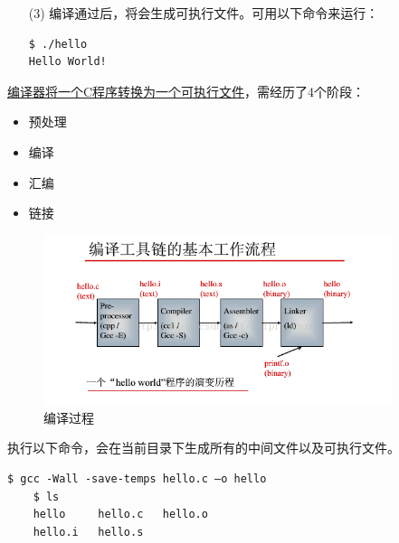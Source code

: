 \begin{frame}[fragile]\ft{\secname}
  \begin{itemize}
  \item[(3)] 编译通过后，将会生成可执行文件。可用以下命令来运行：
    \begin{lstlisting}[backgroundcolor=\color{red!10}]
$ ./hello
Hello World!
    \end{lstlisting}
  \end{itemize}
\end{frame}



\begin{frame}[fragile]\ft{\secname}
  \href{https://blog.csdn.net/elfprincexu/article/details/45043971}{编译器将一个C程序转换为一个可执行文件}，需经历了4个阶段：
  \begin{itemize}
  \item 预处理
  \item 编译
  \item 汇编
  \item 链接
  \end{itemize}

  \begin{figure}
    \centering
    \includegraphics[width=4in]{slide01/images/compile.png}
    \caption{编译过程}
    \label{fig:1}
  \end{figure}
  
\end{frame}


\begin{frame}[fragile]\ft{\secname}
  执行以下命令，会在当前目录下生成所有的中间文件以及可执行文件。
  \begin{lstlisting}[backgroundcolor=\color{red!10}]
    $ gcc -Wall -save-temps hello.c –o hello 
    $ ls 
    hello     hello.c   hello.o
    hello.i   hello.s
  \end{lstlisting}
\end{frame}


